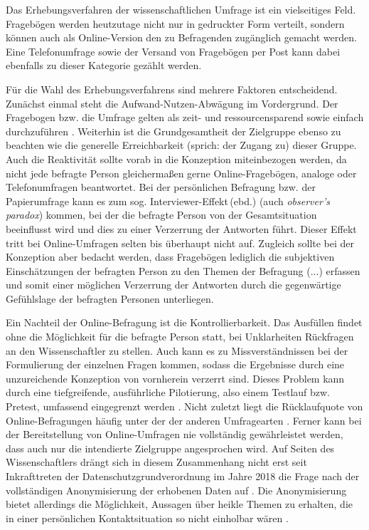 Das Erhebungsverfahren der wissenschaftlichen Umfrage ist ein vielseitiges Feld. Fragebögen werden heutzutage nicht nur in gedruckter Form verteilt, sondern können auch als Online-Version den zu Befragenden zugänglich gemacht werden. Eine Telefonumfrage sowie der Versand von Fragebögen per Post kann dabei ebenfalls zu dieser Kategorie gezählt werden.

Für die Wahl des Erhebungsverfahrens sind mehrere Faktoren entscheidend. Zunächst einmal steht die Aufwand-Nutzen-Abwägung im Vordergrund. Der Fragebogen bzw. die Umfrage gelten als zeit- und ressourcensparend sowie einfach durchzuführen \citep[59]{albert_empirisches_2014}. Weiterhin ist die Grundgesamtheit der Zielgruppe ebenso zu beachten wie die generelle Erreichbarkeit (sprich: der Zugang zu) dieser Gruppe. Auch die Reaktivität sollte vorab in die Konzeption miteinbezogen werden, da nicht jede befragte Person gleichermaßen gerne Online-Fragebögen, analoge oder Telefonumfragen beantwortet. Bei der persönlichen Befragung bzw. der Papierumfrage kann es zum sog. \glqq Interviewer-Effekt\grqq\,(ebd.) (auch \emph{observer's paradox}) kommen, bei der die befragte Person von der Gesamtsituation beeinflusst wird und dies zu einer Verzerrung der Antworten führt. Dieser Effekt tritt bei Online-Umfragen selten bis überhaupt nicht auf. Zugleich sollte bei der Konzeption aber bedacht werden, dass Fragebögen lediglich \glqq die subjektiven Einschätzungen der befragten Person zu den Themen der Befragung (...) erfassen\grqq{} \citep[164]{aeppli_empirisches_2016} und somit einer möglichen Verzerrung der Antworten durch die gegenwärtige Gefühlslage der befragten Personen unterliegen.

\begin{sloppypar}
Ein Nachteil der Online-Befragung ist die Kontrollierbarkeit. Das Ausfüllen findet ohne die Möglichkeit für die befragte Person statt, bei Unklarheiten Rückfragen an den Wissenschaftler zu stellen. Auch kann es zu Missverständnissen bei der Formulierung der einzelnen Fragen kommen, sodass die Ergebnisse durch eine unzureichende Konzeption von vornherein verzerrt sind. Dieses Problem kann durch eine tiefgreifende, ausführliche Pilotierung, also einem Testlauf bzw. Pretest, umfassend eingegrenzt werden \citep[61]{aeppli_empirisches_2016}. Nicht zuletzt liegt die Rücklaufquote von Online-Befragungen häufig unter der der anderen Umfragearten \citep[165]{aeppli_empirisches_2016}. Ferner kann bei der Bereitstellung von Online-Umfragen nie vollständig gewährleistet werden, dass auch nur die intendierte Zielgruppe angesprochen wird. Auf Seiten des Wissenschaftlers drängt sich in diesem Zusammenhang nicht erst seit Inkrafttreten der Datenschutzgrundverordnung im Jahre 2018 die Frage nach der vollständigen Anonymisierung der erhobenen Daten auf \citep[16]{kirchhoff_fragebogen_2010}. Die Anonymisierung bietet allerdings die Möglichkeit, Aussagen über heikle Themen zu erhalten, die in einer persönlichen Kontaktsituation so nicht einholbar wären \citep[165]{aeppli_empirisches_2016}.
\end{sloppypar}

